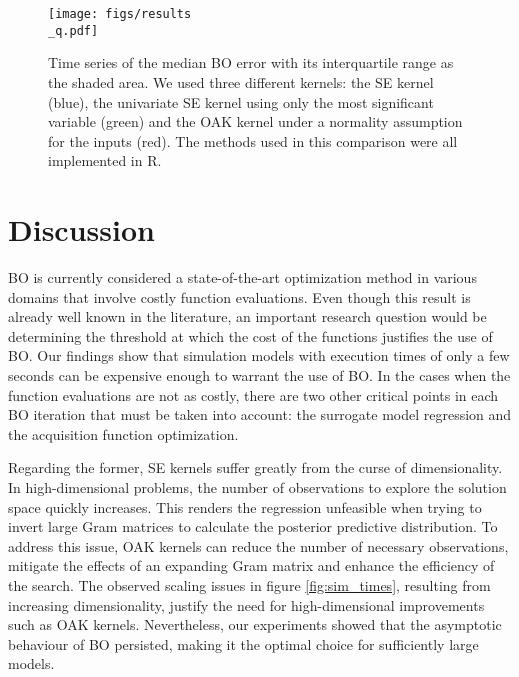 \documentclass{IOS-Book-Article}
\begin{document}
	\begin{figure}[h!]
		\centering	
		\texttt{[image: figs/results\\\_q.pdf]}		
		\caption{Time series of the median BO error with its interquartile range as the shaded area. We used three different kernels: the SE kernel (blue), the univariate SE kernel using only the most significant variable (green) and the OAK kernel under a normality assumption for the inputs (red). The methods used in this comparison were all implemented in R.}
		\label{fig:results_oak}	
	\end{figure}
	
	\section{Discussion}
	BO is currently considered a state-of-the-art optimization method in various domains that involve costly function evaluations. Even though this result is already well known in the literature, an important research question would be determining the threshold at which the cost of the functions justifies the use of BO. Our findings show that simulation models with execution times of only a few seconds can be expensive enough to warrant the use of BO. In the cases when the function evaluations are not as costly, there are two other critical points in each BO iteration that must be taken into account: the surrogate model regression and the acquisition function optimization.
	
	Regarding the former, SE kernels suffer greatly from the curse of dimensionality. In high-dimensional problems, the number of observations to explore the solution space quickly increases. This renders the regression unfeasible when trying to invert large Gram matrices to calculate the posterior predictive distribution. To address this issue, OAK kernels can reduce the number of necessary observations, mitigate the effects of an expanding Gram matrix and enhance the efficiency of the search. The observed scaling issues in figure \ref{fig:sim_times}, resulting from increasing dimensionality, justify the need for high-dimensional improvements such as OAK kernels. Nevertheless, our experiments showed that the asymptotic behaviour of BO persisted, making it the optimal choice for sufficiently large models.
	
\end{document}

